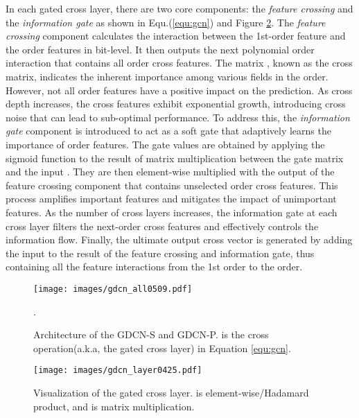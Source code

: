 \documentclass[sigconf]{acmart}
\begin{document}
In each gated cross layer, there are two core components: the \textit{feature crossing} and the \textit{information gate} as shown in Equ.(\ref{equ:gcn}) and Figure \ref{fig:gcn}. The \textit{feature crossing} component calculates the interaction between the 1st-order feature  and the  order features  in bit-level. It then outputs the next polynomial order interaction that contains all  order cross features. The matrix , known as the cross matrix, indicates the inherent importance among various fields in the  order. However, not all  order features have a positive impact on the prediction. As cross depth increases, the cross features exhibit exponential growth, introducing cross noise that can lead to sub-optimal performance. To address this, the \textit{information gate} component is introduced to act as a soft gate that adaptively learns the importance of  order features. The gate values are obtained by applying the sigmoid function  to the result of matrix multiplication between the gate matrix  and the input . They are then element-wise multiplied with the output of the feature crossing component that contains unselected  order cross features. This process amplifies important features and mitigates the impact of unimportant features. As the number of cross layers increases, the information gate at each cross layer filters the next-order cross features and effectively controls the information flow. Finally, the ultimate output cross vector  is generated by adding the input  to the result of the feature crossing and information gate, thus containing all the feature interactions from the 1st order to the  order. 



\begin{figure}[t]
    \setlength{\abovecaptionskip}{0.2cm}
    \setlength{\belowcaptionskip}{-0.2cm}
    \centering
    \texttt{[image: images/gdcn\_all0509.pdf]}
    \caption{Architecture of the GDCN-S and GDCN-P.  is the cross operation(a.k.a, the gated cross layer) in Equation \ref{equ:gcn}.}.
\label{fig:gdcn}
\end{figure}

\begin{figure}[t]
    \setlength{\abovecaptionskip}{0.2cm}
    \setlength{\belowcaptionskip}{-0.2cm}
    \centering
    \texttt{[image: images/gdcn\_layer0425.pdf]}
    \caption{Visualization of the gated cross layer. is element-wise/Hadamard product, and  is matrix multiplication.}
    \label{fig:gcn}
\end{figure}
\end{document}
